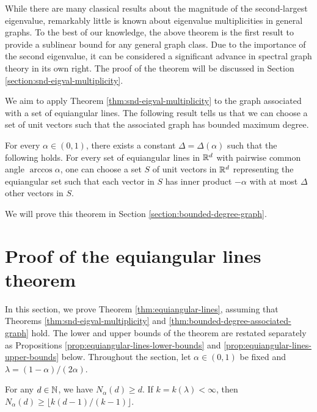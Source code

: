 While there are many classical results about the magnitude of the second-largest eigenvalue, remarkably little is known about eigenvalue multiplicities in general graphs.
To the best of our knowledge, the above theorem is the first result to provide a sublinear bound for any general graph class.
Due to the importance of the second eigenvalue, it can be considered a significant advance in spectral graph theory in its own right.
The proof of the theorem will be discussed in Section \ref{section:snd-eigval-multiplicity}.

We aim to apply Theorem \ref{thm:snd-eigval-multiplicity} to the graph associated with a set of equiangular lines. 
The following result tells us that we can choose a set of unit vectors such that the associated graph has bounded maximum degree.

\begin{theorem} \label{thm:bounded-degree-associated-graph}
    For every $\alpha \in (0, 1)$, there exists a constant $\Delta = \Delta(\alpha)$ such that the following holds. 
    For every set of equiangular lines in $\mathbb{R}^d$ with pairwise common angle $\arccos \alpha$, one can choose a set $S$ of unit vectors in $\mathbb{R}^d$ representing the equiangular set such that each vector in $S$ has inner product $-\alpha$ with at most $\Delta$ other vectors in $S$.
\end{theorem}

We will prove this theorem in Section \ref{section:bounded-degree-graph}.

\section{Proof of the equiangular lines theorem}
In this section, we prove Theorem \ref{thm:equiangular-lines}, assuming that Theorems \ref{thm:snd-eigval-multiplicity} and \ref{thm:bounded-degree-associated-graph} hold.
The lower and upper bounds of the theorem are restated separately as Propositions \ref{prop:equiangular-lines-lower-bounds} and \ref{prop:equiangular-lines-upper-bounds} below.
Throughout the section, let $\alpha \in (0, 1)$ be fixed and $\lambda = (1 - \alpha) / (2 \alpha)$.

\begin{proposition} \label{prop:equiangular-lines-lower-bounds}
    For any $d \in \mathbb{N}$, we have $N_\alpha(d) \ge d$. 
    If \mbox{$k = k(\lambda) < \infty$}, then $N_\alpha(d) \ge \lfloor k(d- 1) / (k - 1) \rfloor$.
\end{proposition}


